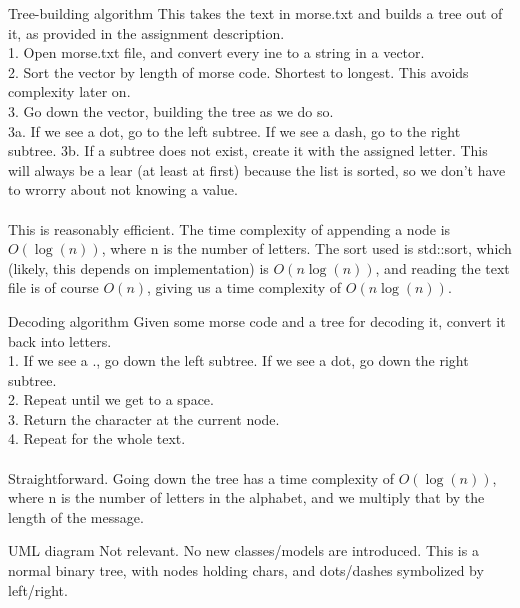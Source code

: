 \documentclass[10pt]{article}
\begin{document}
\begin{section}{Tree-building algorithm}
  This takes the text in morse.txt and builds a tree out of it, as provided in the assignment description.\\
  1. Open morse.txt file, and convert every ine to a string in a vector.\\
  2. Sort the vector by length of morse code. Shortest to longest. This avoids complexity later on.\\
  3. Go down the vector, building the tree as we do so.\\
    3a. If we see a dot, go to the left subtree. If we see a dash, go to the right subtree.
    3b. If a subtree does not exist, create it with the assigned letter. This will always be a lear (at least at first) because the list is sorted, so we don't have to wrorry about not knowing a value.\\
\\
  This is reasonably efficient. The time complexity of appending a node is \(O(\log(n))\), where n is the number of letters. The sort used is std::sort, which (likely, this depends on implementation) is \(O(n\log(n))\), and reading the text file is of course \(O(n)\), giving us a time complexity of \(O(n\log(n))\).
\end{section}
\begin{section}{Decoding algorithm}
  Given some morse code and a tree for decoding it, convert it back into letters.\\
  1. If we see a ., go down the left subtree. If we see a dot, go down the right subtree.\\
  2. Repeat until we get to a space.\\
  3. Return the character at the current node.\\
  4. Repeat for the whole text.\\
  \\
  Straightforward. Going down the tree has a time complexity of \(O(\log(n))\), where n is the number of letters in the alphabet, and we multiply that by the length of the message.
\end{section}
\begin{section}{UML diagram}
  Not relevant. No new classes/models are introduced. This is a normal binary tree, with nodes holding chars, and dots/dashes symbolized by left/right.
\end{section}
\end{document}
